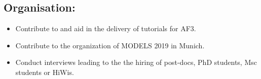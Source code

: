\documentclass{article}
\begin{document}
\begin{appendices}
\subsection{Organisation:}

\begin{itemize}
  \item Contribute to and aid in the delivery of tutorials for AF3.
  \item Contribute to the organization of MODELS 2019 in Munich.
  \item Conduct interviews leading to the the hiring of post-docs, PhD students,
  Msc students or HiWis.
\end{itemize}

\end{appendices}
\end{document}
